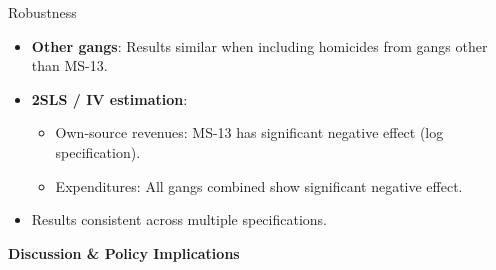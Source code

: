 \documentclass[10pt, hyperref={pdfpagelabels=false}]{beamer}
\newcommand{\sectionslide}[1]{%
  \begin{frame}
  \vfill
  \begin{center}
  {\Large \textcolor{myblue}{\textbf{#1}}}
  \end{center}
  \vfill
  \end{frame}
}
\begin{document}
\begin{frame}{Robustness}

\begin{itemize}
\item \textbf{Other gangs}: Results similar when including homicides from gangs other than MS-13.

\item \textbf{2SLS / IV estimation}:
\begin{itemize}
\item Own-source revenues: MS-13 has significant negative effect (log specification).
\item Expenditures: All gangs combined show significant negative effect.
\end{itemize}

\item Results consistent across multiple specifications.
\end{itemize}

\end{frame}



\sectionslide{Discussion \& Policy Implications}
\end{document}
